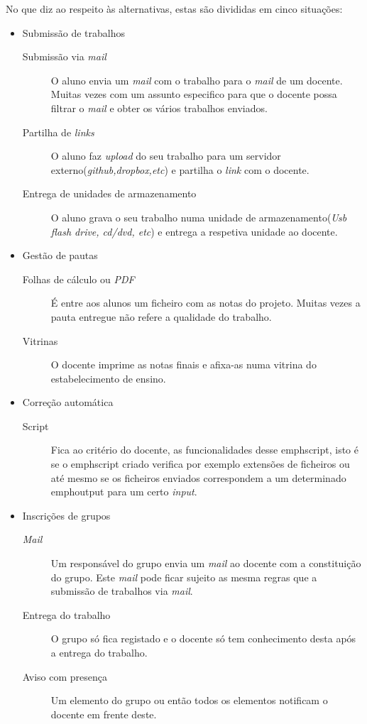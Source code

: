 No que diz ao respeito às alternativas, estas são divididas em cinco situações:
\begin{itemize}
	\item Submissão de trabalhos

	\begin{description}
		\item[Submissão via \emph{mail}] O aluno envia um \emph{mail} com o trabalho para o \emph{mail} de um docente. Muitas vezes com um assunto especifico para que o docente possa filtrar o \emph{mail} e obter os vários trabalhos enviados.
		\item[Partilha de \emph{links}] O aluno faz \emph{upload} do seu trabalho para um servidor externo(\emph{github,dropbox,etc}) e partilha o \emph{link} com o docente.
		\item[Entrega de unidades de armazenamento] O aluno grava o seu trabalho numa unidade de armazenamento(\emph{Usb flash drive, cd/dvd, etc}) e entrega a respetiva unidade ao docente.
	\end{description}

	\item Gestão de pautas

	\begin{description}
		\item[Folhas de cálculo ou \emph{PDF}] É entre aos alunos um ficheiro com as notas do projeto. Muitas vezes a pauta entregue não refere a qualidade do trabalho.
		\item[Vitrinas] O docente imprime as notas finais e afixa-as numa vitrina do estabelecimento de ensino.
	\end{description}

	\item Correção automática

		\begin{description}
			\item[Script] Fica ao critério do docente, as funcionalidades desse emph{script}, isto é se o emph{script} criado verifica por exemplo extensões de ficheiros ou até mesmo se os ficheiros enviados correspondem a um determinado emph{output} para um certo \emph{input}.
		\end{description}
	\item Inscrições de grupos

	\begin{description}
		\item[\emph{Mail}] Um responsável do grupo envia um \emph{mail} ao docente com a constituição do grupo. Este \emph{mail} pode ficar sujeito as mesma regras que a submissão de trabalhos via \emph{mail}.
		\item[Entrega do trabalho] O grupo só fica registado e o docente só tem conhecimento desta após a entrega do trabalho.
		\item[Aviso com presença] Um elemento do grupo ou então todos os elementos notificam o docente em frente deste.
	\end{description}


\end{itemize}

